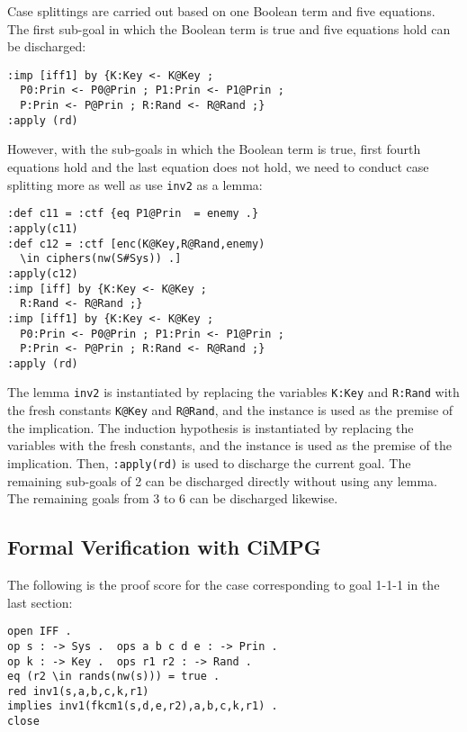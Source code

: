 \documentclass[10pt, conference, compsocconf]{IEEEtran}
\begin{document}
\noindent
Case splittings are carried out based on one Boolean term and five equations. 
The first sub-goal in which the Boolean term is true and five equations hold can be discharged:
\begin{small}
	\begin{verbatim}
:imp [iff1] by {K:Key <- K@Key ; 
  P0:Prin <- P0@Prin ; P1:Prin <- P1@Prin ; 
  P:Prin <- P@Prin ; R:Rand <- R@Rand ;}
:apply (rd)
	\end{verbatim}
\end{small}

However, with the sub-goals in which the Boolean term is true, first fourth equations hold and the last equation does not hold, we need to conduct case splitting more as well as use \verb!inv2! as a lemma:

\begin{small}
	\begin{verbatim}
:def c11 = :ctf {eq P1@Prin  = enemy .}
:apply(c11)
:def c12 = :ctf [enc(K@Key,R@Rand,enemy) 
  \in ciphers(nw(S#Sys)) .]
:apply(c12)
:imp [iff] by {K:Key <- K@Key ; 
  R:Rand <- R@Rand ;}
:imp [iff1] by {K:Key <- K@Key ; 
  P0:Prin <- P0@Prin ; P1:Prin <- P1@Prin ; 
  P:Prin <- P@Prin ; R:Rand <- R@Rand ;}
:apply (rd)
	\end{verbatim}
\end{small}

\noindent
The lemma \verb!inv2! is instantiated by replacing the variables
\verb!K:Key! and \verb!R:Rand! with the fresh constants \verb!K@Key!
and \verb!R@Rand!, and the instance is used as the premise of the
implication. The induction hypothesis is instantiated by
replacing the variables with the
fresh constants, and the instance is
used as the premise of the implication. 
Then, \verb!:apply(rd)! is
used to discharge the current goal.
The remaining sub-goals of 2 can be discharged directly without using any lemma.
The remaining goals from 3 to 6 can be discharged likewise.

\subsection{Formal Verification with CiMPG}
The following is the proof score for the case corresponding to goal 1-1-1 in the last section:
\begin{small}
	\begin{verbatim}
open IFF .
op s : -> Sys .  ops a b c d e : -> Prin .
op k : -> Key .  ops r1 r2 : -> Rand .
eq (r2 \in rands(nw(s))) = true .
red inv1(s,a,b,c,k,r1) 
implies inv1(fkcm1(s,d,e,r2),a,b,c,k,r1) .
close
	\end{verbatim}
\end{small}
		
\end{document}
